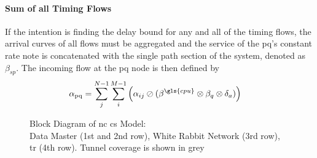 \paragraph{Sum of all Timing Flows}
If the intention is finding the delay bound for any and all of the timing flows, the arrival curves of all flows must be aggregated and the service
of the \gls{pq}'s constant rate note is concatenated with the single path section of the system, denoted as $\beta_{sp}$. The incoming flow at the \gls{pq} node 
is then defined by
\begin{equation}
\begin{aligned}
\mathrm{\alpha_{pq}} &=  \sum_j^{N-1} \sum_i^{M-1} \left( \alpha_{ij} \oslash (\beta^{\gls{cpu}} \otimes \beta_q \otimes \delta_a) \right)
\label{eq:foi_sum}
\end{aligned}
\end{equation}
%
\begin{figure}[H]
  \centering
  \def\svgwidth{0.95\textheight}
  \caption{Block Diagram of \gls{nc}  \gls{cs} Model:\\Data Master (1st and 2nd row), White Rabbit Network (3rd row),\\\gls{tr} (4th row). Tunnel coverage is shown in grey}
  \label{fig:all_block}
\end{figure}



